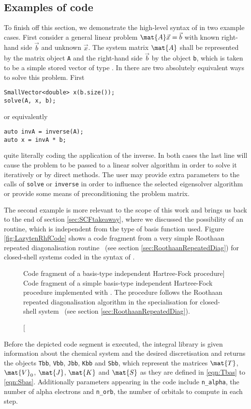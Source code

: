 \subsection{Examples of \lazyten code}
\label{sec:LazytenExamples}
To finish off this section,
we demonstrate the high-level syntax of \lazyten
in two example cases.
First consider a general linear problem $\mat{A} \vec{x} = \vec{b}$
with known right-hand side $\vec{b}$ and unknown $\vec{x}$.
The system matrix $\mat{A}$ shall
be represented by the \lazyten matrix object \texttt{A}
and the right-hand side $\vec{b}$ by the object \texttt{b},
which is taken to be a simple stored vector of type .
In \lazyten there are two absolutely equivalent ways to solve this problem.
First
\begin{lstlisting}[style=c++]
SmallVector<double> x(b.size());
solve(A, x, b);
\end{lstlisting}
or equivalently
\begin{lstlisting}[style=c++]
auto invA = inverse(A);
auto x = invA * b;
\end{lstlisting}
\ie quite literally coding the application of the inverse.
In both cases the last line will cause the problem to be passed
to a linear solver algorithm in order to solve it iteratively
or by direct methods.
The user may provide extra parameters to the calls of \texttt{solve}
or \texttt{inverse} in order to influence
the selected eigensolver algorithm
or provide some means of preconditioning the problem matrix.

The second example is more relevant to the scope of this
work and brings us back to the end of section \vref{sec:SCFtakeaway},
where we discussed the possibility of
an \SCF routine,
which is independent from the type of basis function used.
Figure \vref{fig:LazytenRhfCode} shows a code fragment
from a very simple Roothaan repeated diagonalisation \SCF routine%
~(see section \vref{sec:RoothaanRepeatedDiag})
for closed-shell systems coded in the syntax of \lazyten.

\begin{figure}
	\centering
	\caption
	[Code fragment of a basis-type independent
		Hartree-Fock procedure]
	{Code fragment of a simple basis-type independent
		Hartree-Fock procedure implemented with \lazyten.
		The procedure follows the Roothaan repeated diagonalisation
		algorithm in the specialisation for closed-shell system%
		~(see section \ref{sec:RoothaanRepeatedDiag}).
	}
	\label{fig:LazytenRhfCode}
\end{figure}
Before the depicted code segment is executed,
the integral library is given information about the chemical system
and the desired discretisation and returns
the objects \texttt{Tbb}, \texttt{Vbb}, \texttt{Jbb}, \texttt{Kbb}
and \texttt{Sbb},
which represent the matrices
$\mat{T}$, $\mat{V}_0$, $\mat{J}$, $\mat{K}$ and $\mat{S}$
as they are defined in \eqref{eqn:Tbas} to \eqref{eqn:Sbas}.
Additionally parameters appearing in the code
include \texttt{n\_alpha}, the number of alpha electrons
and \texttt{n\_orb}, the number of \SCF orbitals to compute in each step.

